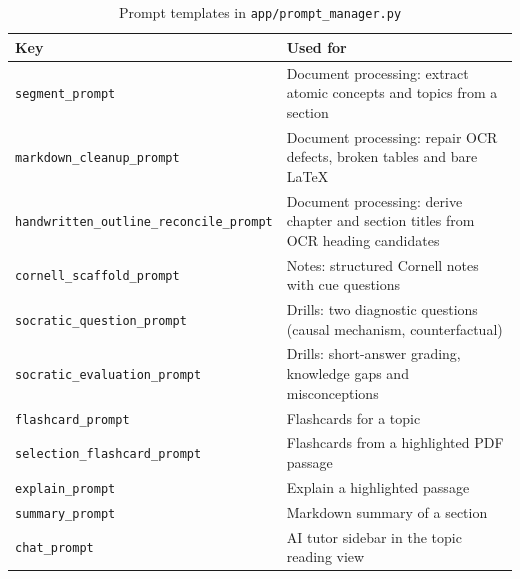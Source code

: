 \begin{table}[htbp]
\centering
\caption{Prompt templates in \texttt{app/prompt\_manager.py}}\label{tab:prompts}
\small
\begin{tabularx}{\textwidth}{@{}l X@{}}
\toprule
\textbf{Key} & \textbf{Used for}\\
\midrule
\texttt{segment\_prompt} & Document processing: extract atomic concepts and topics from a section\\
\texttt{markdown\_cleanup\_prompt} & Document processing: repair OCR defects, broken tables and bare LaTeX\\
\texttt{handwritten\_outline\_reconcile\_prompt} & Document processing: derive chapter and section titles from OCR heading candidates\\
\texttt{cornell\_scaffold\_prompt} & Notes: structured Cornell notes with cue questions\\
\texttt{socratic\_question\_prompt} & Drills: two diagnostic questions (causal mechanism, counterfactual)\\
\texttt{socratic\_evaluation\_prompt} & Drills: short-answer grading, knowledge gaps and misconceptions\\
\texttt{flashcard\_prompt} & Flashcards for a topic\\
\texttt{selection\_flashcard\_prompt} & Flashcards from a highlighted PDF passage\\
\texttt{explain\_prompt} & Explain a highlighted passage\\
\texttt{summary\_prompt} & Markdown summary of a section\\
\texttt{chat\_prompt} & AI tutor sidebar in the topic reading view\\
\bottomrule
\end{tabularx}
\end{table}
